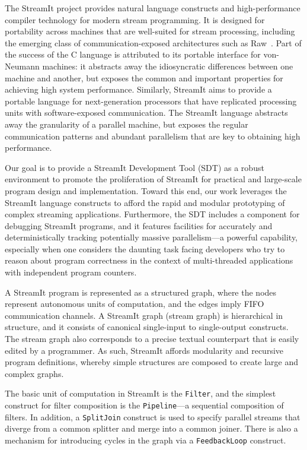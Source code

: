 \documentclass{csailabstractbook}
\begin{document}
The  StreamIt   project  provides  natural   language  constructs  and
high-performance compiler technology for modern stream programming. It
is designed for portability  across machines that are well-suited
for   stream    processing,   including   the    emerging   class   of
communication-exposed architectures such as Raw~\cite{raw}.  Part
of  the  success of  the  C language  is  attributed  to its  portable
interface   for   von-Neumann   machines:   it  abstracts   away   the
idiosyncratic differences between one machine and another, but exposes
the  common  and  important   properties  for  achieving  high  system
performance.  Similarly, StreamIt aims  to provide a portable language
for next-generation  processors that have  replicated processing units
with software-exposed communication.   The StreamIt language abstracts
away the  granularity of a  parallel machine, but exposes  the regular
communication  patterns  and  abundant  parallelism that  are  key  to
obtaining high performance.

Our goal is  to provide a StreamIt Development Tool  (SDT) as a robust
environment to promote the proliferation of StreamIt for practical and
large-scale program  design and  implementation. Toward this  end, our
work leverages  the StreamIt language  constructs to afford  the rapid
and      modular       prototyping      of      complex      streaming
applications. Furthermore, the SDT  includes a component for debugging
StreamIt  programs,  and it  features  facilities  for accurately  and
deterministically   tracking   potentially   massive   parallelism---a
powerful capability,  especially when one considers  the daunting task
facing developers who  try to reason about program  correctness in the
context of multi-threaded applications with independent program counters.


A StreamIt  program is  represented as a  structured graph,  where the
nodes represent autonomous units  of computation, and the edges imply
FIFO  communication  channels.  A  StreamIt graph  (stream  graph)  is
hierarchical in  structure, and it consists  of canonical single-input
to single-output  constructs. The stream  graph also corresponds  to a
precise textual counterpart that is easily edited by a programmer.  As
such, StreamIt  affords modularity and  recursive program definitions,
whereby  simple structures are  composed to  create large  and complex
graphs.

The basic unit of computation in StreamIt is the {\tt Filter}, and the
simplest construct  for filter  composition is the  {\tt Pipeline}---a
sequential  composition of  filters.  In  addition, a  {\tt SplitJoin}
construct  is used  to specify  parallel streams  that diverge  from a
common  splitter and  merge  into a  common  joiner. There  is also  a
mechanism for introducing cycles in the graph via a {\tt FeedbackLoop}
construct.
\end{document}
